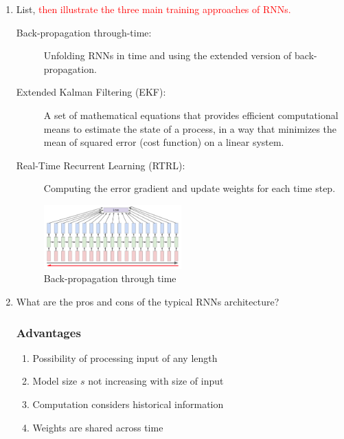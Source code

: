 \documentclass[12pt]{article}
\newenvironment{QandA}{\begin{enumerate}[label=\bfseries\arabic*.]\bfseries}
{\end{enumerate}}
\newenvironment{answered}{\par\normalfont\color{Sepia}}{}
\begin{document}
\begin{QandA}
\begin{answered}
    \end{answered}

    \item List, \textcolor{red}{then illustrate the three main training approaches of RNNs.}
    \begin{answered}
        \begin{description}
            \item[Back-propagation through-time:] Unfolding RNNs in time and using the extended version of back-propagation.
            \item[Extended Kalman Filtering (EKF):] A set of mathematical equations that provides efficient computational means to estimate the state of a process, in a way that minimizes the mean of squared error (cost function) on a linear system.
            \item[Real-Time Recurrent Learning (RTRL):] Computing the error gradient and update weights for each time step.
        \end{description}
        \begin{figure}[H]
            \centering
            \includegraphics[width=0.5\textwidth]{back_prop_time.png}
            \caption{Back-propagation through time}
            \label{fig:backprop}
        \end{figure}
    \end{answered}

    \item What are the pros and cons of the typical RNNs architecture?
    \begin{answered}
        \subsubsection*{Advantages}
        \begin{enumerate}
            \item Possibility of processing input of any length
            \item Model size $s$ not increasing with size of input
            \item Computation considers historical information
            \item Weights are shared across time
        \end{enumerate}

\end{answered}
\end{QandA}
\end{document}
